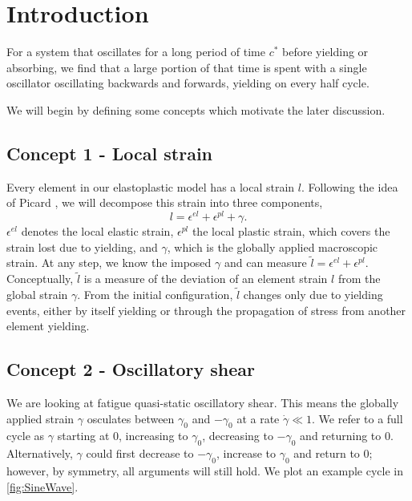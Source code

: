 
\newpage

\def\l{l}
\def\ltilde{\tilde{l}}
\def\gammaMax{\gamma_0}
\def\lw{l_w}
\def\Origin{\mathbb{G}_{xy}(\bm{0})}
\def\Norm{||\mathbb{G}_{xy}||_2}


\section{Introduction}
For a system that oscillates for a long period of time $c^*$ before yielding or absorbing, we find that a large portion of that time is spent with a single oscillator oscillating backwards and forwards, yielding on every half cycle. 


We will begin by defining some concepts which motivate the later discussion.

\subsection{Concept 1 - Local strain}
Every element in our elastoplastic model has a local strain $l$. Following the idea of Picard \etal \cite{picard_elastic_2004}, we will decompose this strain into three components,
\begin{equation}
    \l = \epsilon^{el} + \epsilon^{pl} + \gamma.
\end{equation}
$\epsilon^{el}$ denotes the local elastic strain, $\epsilon^{pl}$ the local plastic strain, which covers the strain lost due to yielding, and $\gamma$, which is the globally applied macroscopic strain. At any step, we know the imposed $\gamma$ and can measure $\ltilde = \epsilon^{el} + \epsilon^{pl}$. Conceptually, $\ltilde$ is a measure of the deviation of an element strain $l$ from the global strain $\gamma$. From the initial configuration, $\ltilde$ changes only due to yielding events, either by itself yielding or through the propagation of stress from another element yielding.

\subsection{Concept 2 - Oscillatory shear}
We are looking at fatigue quasi-static oscillatory shear. This means the globally applied strain $\gamma$ osculates between $\gammaMax$ and $-\gammaMax$ at a rate $\dot{\gamma} \ll 1$. We refer to a full cycle as $\gamma$ starting at $0$, increasing to $\gammaMax$, decreasing to $-\gammaMax$ and returning to $0$. Alternatively, $\gamma$ could first decrease to $-\gammaMax$, increase to $\gammaMax$ and return to $0$; however, by symmetry,  all arguments will still hold. We plot an example cycle in \cref{fig:SineWave}. 

